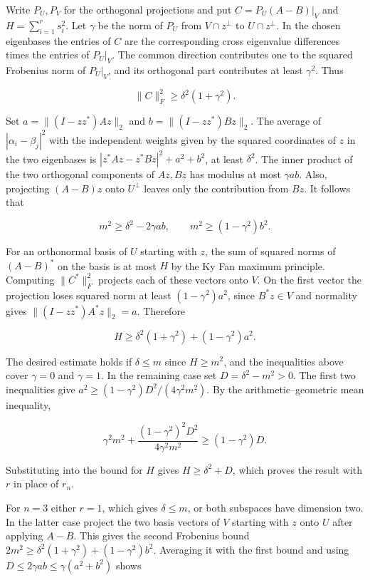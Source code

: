 \documentclass[11pt,a4paper]{article}
\begin{document}
Write \(P_U,P_V\) for the orthogonal projections and put
\(C=P_U(A-B)|_V\) and \(H=\sum_{i=1}^r s_i^2\). Let \(\gamma\) be the
norm of \(P_U\) from \(V\cap z^\perp\) to \(U\cap z^\perp\). In the
chosen eigenbases the entries of \(C\) are the corresponding cross
eigenvalue differences times the entries of \(P_U|_V\). The common
direction contributes one to the squared Frobenius norm of \(P_U|_V\),
and its orthogonal part contributes at least \(\gamma^2\). Thus

\[\|C\|_F^2\ge\delta^2(1+\gamma^2).\]

Set \(a=\|(I-zz^*)Az\|_2\) and \(b=\|(I-zz^*)Bz\|_2\). The average of
\(|\alpha_i-\beta_j|^2\) with the independent weights given by the
squared coordinates of \(z\) in the two eigenbases is
\(|z^*Az-z^*Bz|^2+a^2+b^2\), at least \(\delta^2\). The inner product of
the two orthogonal components of \(Az,Bz\) has modulus at most
\(\gamma ab\). Also, projecting \((A-B)z\) onto \(U^\perp\) leaves only
the contribution from \(Bz\). It follows that

\[m^2\ge\delta^2-2\gamma ab,\qquad m^2\ge(1-\gamma^2)b^2.\]

For an orthonormal basis of \(U\) starting with \(z\), the sum of
squared norms of \((A-B)^*\) on the basis is at most \(H\) by the Ky Fan
maximum principle. Computing \(\|C^*\|_F^2\) projects each of these
vectors onto \(V\). On the first vector the projection loses squared
norm at least \((1-\gamma^2)a^2\), since \(B^*z\in V\) and normality
gives \(\|(I-zz^*)A^*z\|_2=a\). Therefore

\[H\ge\delta^2(1+\gamma^2)+(1-\gamma^2)a^2.\]

The desired estimate holds if \(\delta\le m\) since \(H\ge m^2\), and
the inequalities above cover \(\gamma=0\) and \(\gamma=1\). In the
remaining case set \(D=\delta^2-m^2>0\). The first two inequalities give
\(a^2\ge (1-\gamma^2)D^2/(4\gamma^2m^2)\). By the arithmetic--geometric
mean inequality,

\[\gamma^2m^2+\frac{(1-\gamma^2)^2D^2}{4\gamma^2m^2}
\ge (1-\gamma^2)D.\]

Substituting into the bound for \(H\) gives \(H\ge\delta^2+D\), which
proves the result with \(r\) in place of \(r_n\).

For \(n=3\) either \(r=1\), which gives \(\delta\le m\), or both
subspaces have dimension two. In the latter case project the two basis
vectors of \(V\) starting with \(z\) onto \(U\) after applying \(A-B\).
This gives the second Frobenius bound
\(2m^2\ge\delta^2(1+\gamma^2)+(1-\gamma^2)b^2\). Averaging it with the
first bound and using \(D\le 2\gamma ab\le\gamma(a^2+b^2)\) shows
\end{document}
